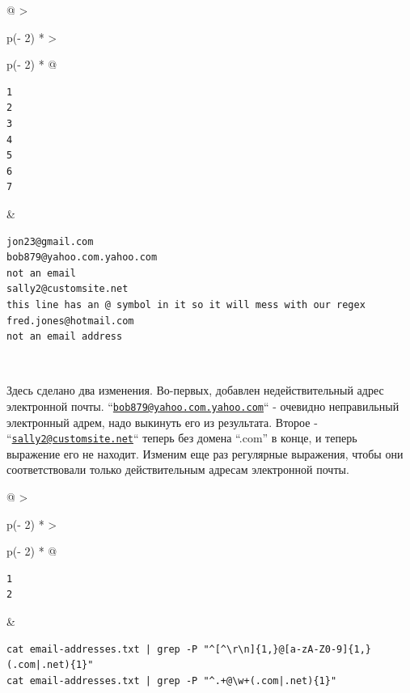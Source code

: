 \documentclass{article}
\begin{document}
\begin{longtable}[]{@{}
  >{\raggedright\arraybackslash}p{(\columnwidth - 2\tabcolsep) * }
  >{\raggedright\arraybackslash}p{(\columnwidth - 2\tabcolsep) * }@{}}
\toprule
\endhead
\begin{minipage}[t]{\linewidth}\raggedright
\begin{verbatim}
1
2
3
4
5
6
7
\end{verbatim}
\end{minipage} & \begin{minipage}[t]{\linewidth}\raggedright
\begin{verbatim}
jon23@gmail.com
bob879@yahoo.com.yahoo.com
not an email
sally2@customsite.net
this line has an @ symbol in it so it will mess with our regex
fred.jones@hotmail.com
not an email address
\end{verbatim}
\end{minipage} \\ \addlinespace
\bottomrule
\end{longtable}

Здесь сделано два изменения. Во-первых, добавлен недействительный адрес
электронной почты.
``\href{mailto:bob879@yahoo.com.yahoo.com}{\nolinkurl{bob879@yahoo.com.yahoo.com}}``
- очевидно неправильный электронный адрем, надо выкинуть его из
результата. Второе -
``\href{mailto:sally2@customsite.net}{\nolinkurl{sally2@customsite.net}}``
теперь без домена ``.com'' в конце, и теперь выражение его не находит.
Изменим еще раз регулярные выражения, чтобы они соответствовали только
действительным адресам электронной почты.

\begin{longtable}[]{@{}
  >{\raggedright\arraybackslash}p{(\columnwidth - 2\tabcolsep) * }
  >{\raggedright\arraybackslash}p{(\columnwidth - 2\tabcolsep) * }@{}}
\toprule
\endhead
\begin{minipage}[t]{\linewidth}\raggedright
\begin{verbatim}
1
2
\end{verbatim}
\end{minipage} & \begin{minipage}[t]{\linewidth}\raggedright
\begin{verbatim}
cat email-addresses.txt | grep -P "^[^\r\n]{1,}@[a-zA-Z0-9]{1,}(.com|.net){1}"
cat email-addresses.txt | grep -P "^.+@\w+(.com|.net){1}"
\end{verbatim}
\end{minipage} \\ \addlinespace
\bottomrule
\end{longtable}
\end{document}
